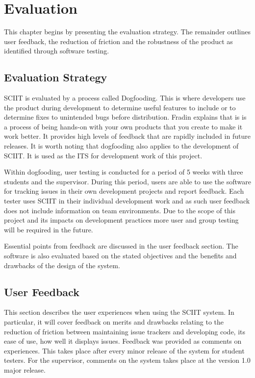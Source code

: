 \documentclass{mproj}
\begin{document}
\chapter{Evaluation}\label{evaluation}

This chapter begins by presenting the evaluation strategy. The remainder outlines user feedback, the reduction of friction and the robustness of the product as identified through software testing. 

\section{Evaluation Strategy}

SCIIT is evaluated by a process called Dogfooding. This is where developers use the product during development to determine useful features to include or to determine fixes to unintended bugs before distribution. Fradin \cite{Dogfooding} explains that is is a process of being hands-on with your own products that you create to make it work better. It provides high levels of feedback that are rapidly included in future releases. It is worth noting that dogfooding also applies to the development of SCIIT. It is used as the ITS for development work of this project.

Within dogfooding, user testing is conducted for a period of 5 weeks with three students and the supervisor. During this period, users are able to use the software for tracking issues in their own development projects and report feedback. Each tester uses SCIIT in their individual development work and as such user feedback does not include information on team environments. Due to the scope of this project and its impacts on development practices more user and group testing will be required in the future. 

Essential points from feedback are discussed in the user feedback section. The software is also evaluated based on the stated objectives and the benefits and drawbacks of the design of the system.


\section{User Feedback}

This section describes the user experiences when using the SCIIT system. In particular, it will cover feedback on merits and drawbacks relating to the reduction of friction between maintaining issue trackers and developing code, its ease of use, how well it displays issues. Feedback was provided as comments on experiences. This takes place after every minor release of the system for student testers. For the supervisor, comments on the system takes place at the version 1.0 major release.
\end{document}
